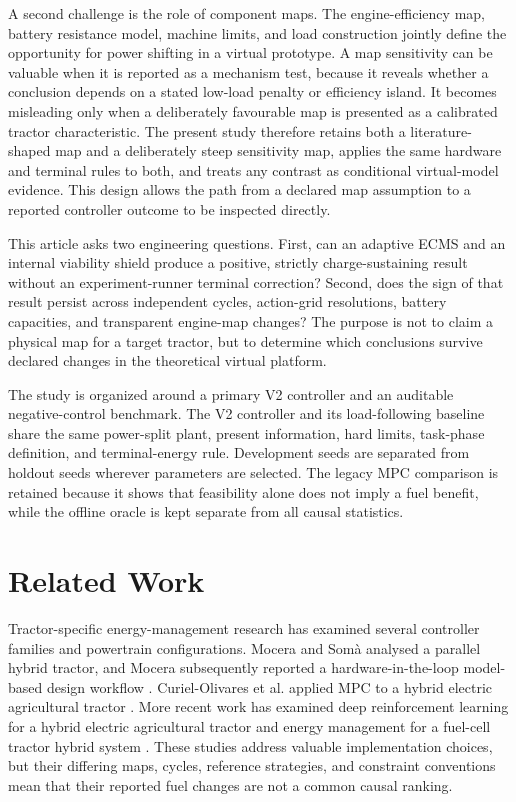 \documentclass[energies,article,submit,moreauthors]{Definitions/mdpi}
\begin{document}
A second challenge is the role of component maps. The engine-efficiency map, battery resistance model, machine limits, and load construction jointly define the opportunity for power shifting in a virtual prototype. A map sensitivity can be valuable when it is reported as a mechanism test, because it reveals whether a conclusion depends on a stated low-load penalty or efficiency island. It becomes misleading only when a deliberately favourable map is presented as a calibrated tractor characteristic. The present study therefore retains both a literature-shaped map and a deliberately steep sensitivity map, applies the same hardware and terminal rules to both, and treats any contrast as conditional virtual-model evidence. This design allows the path from a declared map assumption to a reported controller outcome to be inspected directly.

This article asks two engineering questions. First, can an adaptive ECMS and an internal viability shield produce a positive, strictly charge-sustaining result without an experiment-runner terminal correction? Second, does the sign of that result persist across independent cycles, action-grid resolutions, battery capacities, and transparent engine-map changes? The purpose is not to claim a physical map for a target tractor, but to determine which conclusions survive declared changes in the theoretical virtual platform.

The study is organized around a primary V2 controller and an auditable negative-control benchmark. The V2 controller and its load-following baseline share the same power-split plant, present information, hard limits, task-phase definition, and terminal-energy rule. Development seeds are separated from holdout seeds wherever parameters are selected. The legacy MPC comparison is retained because it shows that feasibility alone does not imply a fuel benefit, while the offline oracle is kept separate from all causal statistics.

\section{Related Work}
Tractor-specific energy-management research has examined several controller families and powertrain configurations. Mocera and Som\`a analysed a parallel hybrid tractor, and Mocera subsequently reported a hardware-in-the-loop model-based design workflow \cite{mocera2020,mocera2020b}. Curiel-Olivares et al. applied MPC to a hybrid electric agricultural tractor \cite{curiel2023}. More recent work has examined deep reinforcement learning for a hybrid electric agricultural tractor \cite{wu2024} and energy management for a fuel-cell tractor hybrid system \cite{zhao2024}. These studies address valuable implementation choices, but their differing maps, cycles, reference strategies, and constraint conventions mean that their reported fuel changes are not a common causal ranking.
\end{document}
